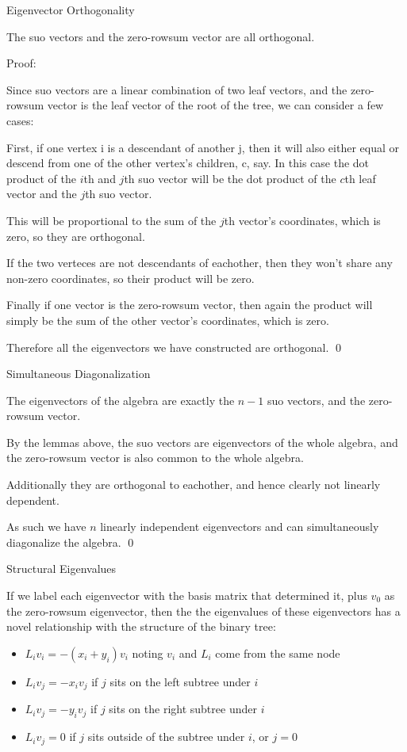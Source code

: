 \documentclass[10pt,a4paper]{report}
\begin{document}
\begin{lemma} Eigenvector Orthogonality

	The suo vectors and the zero-rowsum vector are all orthogonal.
\end{lemma}

Proof:

Since suo vectors are a linear combination of two leaf vectors, and the
zero-rowsum vector is the leaf vector of the root of the tree, we can consider
a few cases:

First, if one vertex i is a descendant of another j, then it will also either
equal or descend from one of the other vertex's children, c, say.  In this case
the dot product of the $i$th and $j$th suo vector will be the dot product of
the $c$th leaf vector and the $j$th suo vector.

This will be proportional to the sum of the $j$th vector's coordinates, which
is zero, so they are orthogonal.

If the two verteces are not descendants of eachother, then they won't share any
non-zero coordinates, so their product will be zero.

Finally if one vector is the zero-rowsum vector, then again the product will
simply be the sum of the other vector's coordinates, which is zero.

Therefore all the eigenvectors we have constructed are orthogonal. \qed

\begin{theorem} Simultaneous Diagonalization

	The eigenvectors of the algebra are exactly the $n-1$ suo vectors, and the
	zero-rowsum vector.
\end{theorem}

By the lemmas above, the suo vectors are eigenvectors of the whole algebra, and
the zero-rowsum vector is also common to the whole algebra.

Additionally they are orthogonal to eachother, and hence clearly not linearly
dependent.

As such we have $n$ linearly independent eigenvectors and can simultaneously
diagonalize the algebra. \qed

\begin{lemma} Structural Eigenvalues

	If we label each eigenvector with the basis matrix that determined it, plus
	$v_0$ as the zero-rowsum eigenvector, then the the eigenvalues of these
	eigenvectors has a novel relationship with the structure of the binary
	tree:
	\begin{itemize}
		\item ${L_i}{v_i} = -(x_i + y_i)v_i$ noting $v_i$ and $L_i$ come from
			the same node
		\item ${L_i}{v_j} = -{x_i}{v_j}$ if $j$ sits on the left subtree under
			$i$
		\item ${L_i}{v_j} = -{y_i}{v_j}$ if $j$ sits on the right subtree under
			$i$
		\item ${L_i}{v_j} = 0$ if $j$ sits outside of the subtree under $i$, or
			$j=0$
	\end{itemize}
\end{lemma}
\end{document}
